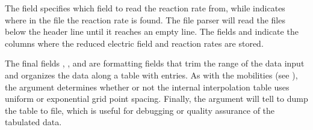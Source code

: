 \documentclass[letterpaper,10pt,english]{sphinxmanual}
\begin{document}
\begin{sphinxVerbatim}[commandchars=\\\{\},formatcom=\scriptsize]
  \PYG{p}{[}
       
       
       
       
       
       
       
       
       
       
       
       
  \PYG{p}{]}
\end{sphinxVerbatim}

The  field specifies which field to read the reaction rate from, while  indicates where in the file the reaction rate is found.
The file parser will read the files below the header line until it reaches an empty line.
The fields  and  indicate the columns where the reduced electric field and reaction rates are stored.

The final fields , , and  are formatting fields that trim the range of the data input and organizes the data along a table with  entries.
As with the mobilities (see ), the  argument determines whether or not the internal interpolation table uses uniform or exponential grid point spacing.
Finally, the  argument will tell  to dump the table to file, which is useful for debugging or quality assurance of the tabulated data.
\end{document}
